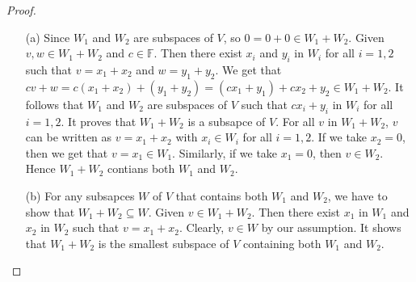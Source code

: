\begin{proof}$ $

	\begin{itemize}
				\item [(a)] Since $W_1$ and $W_2$ are subspaces of $V$, so $0 = 0 + 0 \in W_1 + W_2$. Given $v,w \in W_1 + W_2$ and $c \in \mathbb{F}$. Then there exist $x_i$ and $y_i$ in $W_i$ for all $i = 1,2$ such that $v = x_1 + x_2$ and $w = y_1 + y_2$. We get that $cv + w = c( x_1 + x_2) + ( y_1 + y_2) = (cx_1 + y_1) + cx_2 + y_2 \in W_1 + W_2$. It follows that $W_1$ and $W_2$ are subspaces of $V$ such that $cx_i + y_i$ in $W_i$ for all $i = 1,2$. It proves that $W_1 + W_2$ is a subsapce of $V$. For all $v$ in $W_1 + W_2$, $v$ can be written as $v = x_1 + x_2$ with $x_i \in W_i$ for all $i = 1,2$. If we take $x_2 = 0$, then we get that $v = x_1 \in W_1$. Similarly, if we take $x_1 = 0$, then $v \in W_2$. Hence $W_1 + W_2$ contians both $W_1$ and $W_2$.
				\item [(b)] For any subsapces $W$ of $V$ that contains both $W_1$ and $W_2$, we have to show that $W_1 + W_2 \subseteq W$. Given $v \in W_1 + W_2$. Then there exist $x_1$ in $W_1$ and $x_2$ in $W_2$ such that $v = x_1 + x_2$. Clearly, $v \in W$ by our assumption. It shows that $W_1 + W_2$ is the smallest subspace of $V$ containing both $W_1$ and $W_2$.
			\end{itemize}
\end{proof}
			
